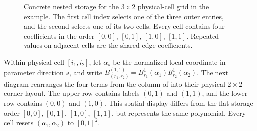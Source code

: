 \begin{figure}[H]
    \caption{Concrete nested  storage for the $3\times2$ physical-cell grid in the example. The first cell index selects one of the three outer entries, and the second selects one of its two cells. Every cell contains four coefficients in the  order $[0,0]$, $[0,1]$, $[1,0]$, $[1,1]$. Repeated values on adjacent cells are the shared-edge coefficients.}
    \label{fig:localvalues-tree}
\end{figure}

Within physical cell $[i_1,i_2]$, let $\alpha_s$ be the normalized local coordinate in parameter direction $s$, and write $B_{(r_1,r_2)}^{(1,1)}=B_{r_1}^{1}(\alpha_1)B_{r_2}^{1}(\alpha_2)$. The next diagram rearranges the four terms from the  column of \allowbreak{} into their physical $2\times2$ corner layout. The upper row contains labels $(0,1)$ and $(1,1)$, and the lower row contains $(0,0)$ and $(1,0)$. This spatial display differs from the flat  storage order $[0,0]$, $[0,1]$, $[1,0]$, $[1,1]$, but represents the same polynomial. Every cell resets $(\alpha_1,\alpha_2)$ to $[0,1]^2$.

